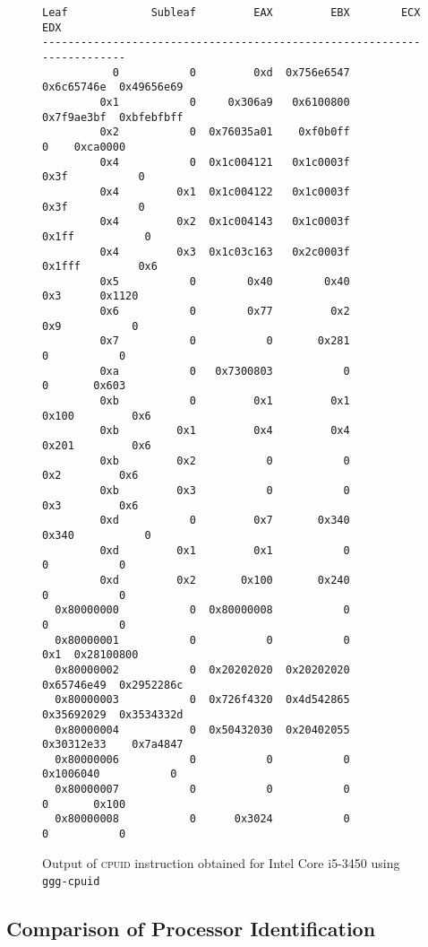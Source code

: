 \documentclass[a4paper,10pt,oneside,unicode]{article}
\newcommand{\cpuid}{\textsc{cpuid} }
\begin{document}
\begin{figure}[htbp]
\centering
\begin{verbatim}
Leaf             Subleaf         EAX         EBX        ECX          EDX
------------------------------------------------------------------------
           0           0         0xd  0x756e6547  0x6c65746e  0x49656e69
         0x1           0     0x306a9   0x6100800  0x7f9ae3bf  0xbfebfbff
         0x2           0  0x76035a01    0xf0b0ff           0    0xca0000
         0x4           0  0x1c004121   0x1c0003f        0x3f           0
         0x4         0x1  0x1c004122   0x1c0003f        0x3f           0
         0x4         0x2  0x1c004143   0x1c0003f       0x1ff           0
         0x4         0x3  0x1c03c163   0x2c0003f      0x1fff         0x6
         0x5           0        0x40        0x40         0x3      0x1120
         0x6           0        0x77         0x2         0x9           0
         0x7           0           0       0x281           0           0
         0xa           0   0x7300803           0           0       0x603
         0xb           0         0x1         0x1       0x100         0x6
         0xb         0x1         0x4         0x4       0x201         0x6
         0xb         0x2           0           0         0x2         0x6
         0xb         0x3           0           0         0x3         0x6
         0xd           0         0x7       0x340       0x340           0
         0xd         0x1         0x1           0           0           0
         0xd         0x2       0x100       0x240           0           0
  0x80000000           0  0x80000008           0           0           0
  0x80000001           0           0           0         0x1  0x28100800
  0x80000002           0  0x20202020  0x20202020  0x65746e49  0x2952286c
  0x80000003           0  0x726f4320  0x4d542865  0x35692029  0x3534332d
  0x80000004           0  0x50432030  0x20402055  0x30312e33    0x7a4847
  0x80000006           0           0           0   0x1006040           0
  0x80000007           0           0           0           0       0x100
  0x80000008           0      0x3024           0           0           0
\end{verbatim}

    \caption{Output of \cpuid instruction obtained for Intel\textregistered{} Core\texttrademark{} i5-3450 using \texttt{ggg-cpuid}~\cite{ggg-cpuid}}\label{fig:real-hw}
\end{figure}

\subsection{Comparison of Processor Identification}
\end{document}
